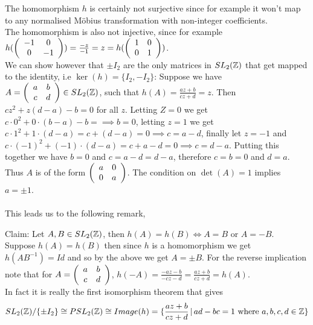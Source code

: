 The homomorphism $h$ is certainly not surjective since for example it won't map to any normalised Möbius transformation with non-integer coefficients. \\
The homomorphism is also not injective, since for example $h(\left(\begin{array}{ c c } -1 & 0 \\ 0 & -1 \end{array} \right)) = \frac{-z}{-1} = z = h( \left(\begin{array}{ c c } 1 & 0 \\ 0 & 1 \end{array} \right))$. \\
We can show however that $\pm I_2$ are the only matrices in $SL_2(\mathbb{Z})$ that get mapped to the identity, i.e $\ker(h) = \{I_2, -I_2 \}$:  
Suppose we have $A = \left(\begin{array}{ c c } a & b \\ c & d \end{array} \right) \in SL_2(\mathbb{Z})$, such that $h(A) = \frac{az +b}{cz +d} = z$. Then $cz^2 + z(d-a) -b = 0$ for all $z$. Letting $Z = 0 $ we get $ c \cdot 0^2 + 0 \cdot(b-a) - b = \implies b = 0$, letting $z = 1$ we get $c\cdot 1^2 + 1\cdot(d-a) =c +(d-a) = 0 \implies c = a-d$, finally let $z = -1$ and $c\cdot {(-1)}^2 + (-1)\cdot(d-a) =c +a-d =0 \implies c = d-a$. Putting this together we have $b = 0$ and $c = a-d = d-a$, therefore $c = b = 0$ and $ d = a$. Thus $A$ is of the form $\left(\begin{array}{ c c } a & 0 \\ 0 & a \end{array} \right)$. The condition on $\det(A) = 1$ implies $a = \pm 1$. \\
\\

This leads us to the following remark, 
\begin{remark}
Claim: Let $A, B \in SL_2(\mathbb{Z})$, then $h(A) = h(B) \iff A = B \text{ or } A = -B$.\\
Suppose $h(A) = h(B)$ then since $h$ is a homomorphism we get $h(AB^{-1}) = Id$ and so by the above we get $A =\pm B$. For the reverse implication note that for $A = \left(\begin{array}{ c c } a & b \\ c & d \end{array} \right)$, $h(-A) = \frac{-az -b}{-cz - d} = \frac{az +b}{cz +d} = h(A)$. \\
In fact it is really the first isomorphism theorem that gives 
$$SL_2(\mathbb{Z}) / \{ \pm I_2 \} \cong PSL_2(\mathbb{Z}) \cong Image(h) = \{ \frac{az + b}{cz +d} \, \vert \, ad -bc =1 \text{ where } a,b,c,d \in \mathbb{Z}\}$$
\end{remark}

